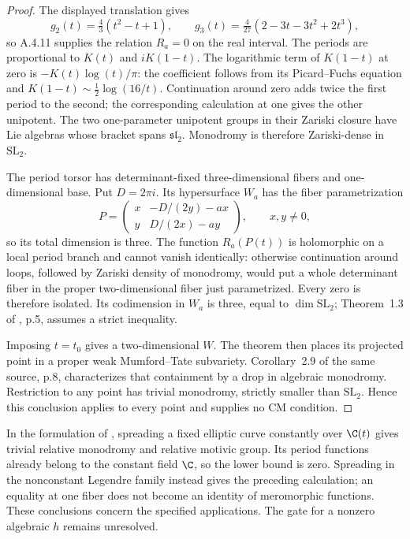 \begin{proof}
The displayed translation gives
\[
 g_2(t)=\tfrac43(t^2-t+1),\qquad
 g_3(t)=\tfrac4{27}(2-3t-3t^2+2t^3),
\]
so A.4.11 supplies the relation $R_a=0$ on the real interval. The periods are proportional to $K(t)$ and $iK(1-t)$. The logarithmic term of $K(1-t)$ at zero is $-K(t)\log(t)/\pi$: the coefficient follows from its Picard--Fuchs equation and $K(1-t)\sim\tfrac12\log(16/t)$. Continuation around zero adds twice the first period to the second; the corresponding calculation at one gives the other unipotent. The two one-parameter unipotent groups in their Zariski closure have Lie algebras whose bracket spans $\mathfrak{sl}_2$. Monodromy is therefore Zariski-dense in $\mathrm{SL}_2$.

The period torsor has determinant-fixed three-dimensional fibers and one-dimensional base. Put $D=2\pi i$. Its hypersurface $W_a$ has the fiber parametrization
\[
 P=\begin{pmatrix}
 x&-D/(2y)-ax\\y&D/(2x)-ay
 \end{pmatrix},\qquad x,y\ne0,
\]
so its total dimension is three. The function $R_a(P(t))$ is holomorphic on a local period branch and cannot vanish identically: otherwise continuation around loops, followed by Zariski density of monodromy, would put a whole determinant fiber in the proper two-dimensional fiber just parametrized. Every zero is therefore isolated. Its codimension in $W_a$ is three, equal to $\dim\mathrm{SL}_2$; Theorem~1.3 of \cite{EllBakkerTsimerman2025}, p.5, assumes a strict inequality.

Imposing $t=t_0$ gives a two-dimensional $W$. The theorem then places its projected point in a proper weak Mumford--Tate subvariety. Corollary~2.9 of the same source, p.8, characterizes that containment by a drop in algebraic monodromy. Restriction to any point has trivial monodromy, strictly smaller than $\mathrm{SL}_2$. Hence this conclusion applies to every point and supplies no CM condition.
\end{proof}

In the formulation of \cite[Theorem 4.25, p.18]{EllBakkerTsimerman2025}, spreading a fixed elliptic curve constantly over $\C(t)$ gives trivial relative monodromy and relative motivic group. Its period functions already belong to the constant field $\C$, so the lower bound is zero. Spreading in the nonconstant Legendre family instead gives the preceding calculation; an equality at one fiber does not become an identity of meromorphic functions. These conclusions concern the specified applications. The gate for a nonzero algebraic $h$ remains unresolved.

